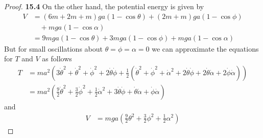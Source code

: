 \documentclass[11pt]{article}
\theoremstyle{definition}
\begin{document}
\begin{proof}{\textbf{15.4}}
    On the other hand, the potential energy is given by
    \begin{align*}
        V &= (6m + 2m + m)g a(1 - \cos\theta) 
        + (2m + m)g a(1 - \cos\phi)\\
        &\quad+ mga(1 - \cos\alpha)\\
        &= 9mga(1 - \cos\theta) + 3mga(1 - \cos\phi) + mga(1 - \cos\alpha)
    \end{align*}
    But for small oscillations about $\theta = \phi = \alpha = 0$
    we can approximate the equations for $T$ and $V$ as follows
    \begin{align*}
        T &= ma^2\left(3\dot\theta^2
        + \dot\theta^2 + \dot\phi^2 + 2\dot\theta\dot\phi
        + \frac{1}{2}(\dot\theta^2 + \dot\phi^2 + \dot\alpha^2 +
        2\dot\theta\dot\phi + 2\dot\theta\dot\alpha + 2\dot\phi\dot\alpha
        )\right)\\
        &= ma^2\left(\frac{9}{2}\dot\theta^2 + \frac{3}{2}\dot\phi^2
        + \frac{1}{2}\dot\alpha^2 + 3\dot\theta\dot\phi
        + \dot\theta\dot\alpha + \dot\phi\dot\alpha \right)
    \end{align*}
    and
    \begin{align*}
        V &= mga\left(\frac{9}{2}\theta^2 + \frac{3}{2}\phi^2
        + \frac{1}{2} \alpha^2\right)
    \end{align*}


\end{proof}
\end{document}
